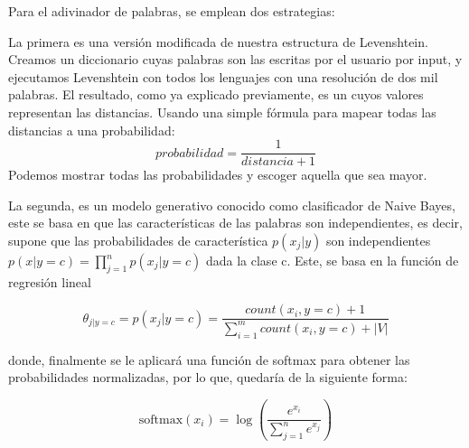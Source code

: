 Para el adivinador de palabras, se emplean dos estrategias:\bigskip

La primera es una versión modificada de nuestra estructura de Levenshtein. Creamos un diccionario  cuyas palabras son las escritas por el usuario por input, y ejecutamos Levenshtein con todos los lenguajes con una resolución de dos mil palabras. El resultado, como ya explicado previamente, es un  cuyos valores representan las distancias. Usando una simple fórmula para mapear todas las distancias a una probabilidad: 
\[probabilidad = \frac{1}{distancia + 1}\]
Podemos mostrar todas las probabilidades y escoger aquella que sea mayor.\bigskip

La segunda, es un modelo generativo conocido como clasificador de Naive Bayes, este se basa en que las características de las palabras son independientes, es decir, supone que las probabilidades de característica $p(x_j|y)$ son independientes $p(x|y = c) = \prod_{j=1}^n p(x_j|y = c)$ dada la clase c. Este, se basa en la función de regresión lineal 

\[\theta_{j|y=c} = p(x_j|y = c) = \frac{count(x_i,y = c) + 1}{\sum_{i=1}^m count(x_i,y = c) + |V|}\]

donde, finalmente se le aplicará una función de softmax para obtener las probabilidades normalizadas, por lo que, quedaría de la siguiente forma: 

\[\text{softmax}(x_i) = \log\left(\frac{e^{x_i}}{\sum_{j=1}^{n} e^{x_j}}\right)\]
